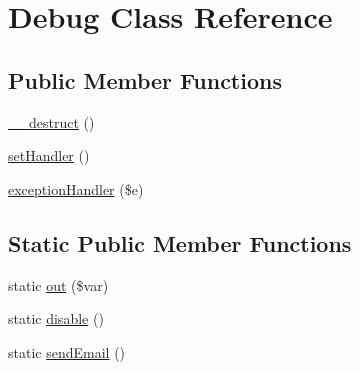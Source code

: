 \hypertarget{class_debug}{\section{Debug Class Reference}
\label{class_debug}
}
\subsection*{Public Member Functions}
\begin{DoxyCompactItemize}
\item 
\hyperlink{class_debug_a421831a265621325e1fdd19aace0c758}{\-\_\-\-\_\-destruct} ()
\item 
\hyperlink{class_debug_a475b1cea5652fafc04c94e97ef82fe83}{set\-Handler} ()
\item 
\hyperlink{class_debug_af17dfe92627c634e9450cf38eaef881b}{exception\-Handler} (\$e)
\end{DoxyCompactItemize}
\subsection*{Static Public Member Functions}
\begin{DoxyCompactItemize}
\item 
static \hyperlink{class_debug_aa7753ac7959d9c3b8c719d1724921afd}{out} (\$var)
\item 
static \hyperlink{class_debug_a5471c4c9c443d5a497b7383a6fc63fcc}{disable} ()
\item 
static \hyperlink{class_debug_afab2003e3e8a5d673f58811a1dd27310}{send\-Email} ()
\end{DoxyCompactItemize}

